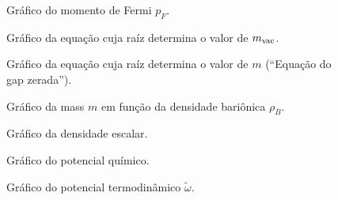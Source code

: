 \begin{enumerate}
\FloatBarrier


\begin{figure}
	
	\caption{Gráfico do momento de Fermi $p_F$. \protect}
	\label{Fig:fermi_momentum_NJL-Buballa_Set_1}
\end{figure}

\begin{figure}
	
	\caption{Gráfico da equação cuja raíz determina o valor de $m_{\rm{vac}}$. \protect}
	\label{Fig:vacuum_mass_equation_NJL-Buballa_Set_1}
\end{figure}

\begin{figure}
	
	\caption{Gráfico da equação cuja raíz determina o valor de $m$ (``Equação do gap zerada''). \protect}
	\label{Fig:gap_NJL-Buballa_Set_1}
\end{figure}

\begin{figure}
	
	\caption{Gráfico da mass $m$ em função da densidade bariônica $\rho_B$. \protect}
	\label{Fig:mass_NJL-Buballa_Set_1}
\end{figure}


\begin{figure}
	
	\caption{Gráfico da densidade escalar. \protect}
	\label{Fig:scalar_density_NJL-Buballa_Set_1}
\end{figure}

\begin{figure}
	
	\caption{Gráfico do potencial químico. \protect}
	\label{Fig:chemical_potential_NJL-Buballa_Set_1}
\end{figure}

\begin{figure}
	
	\caption{Gráfico do potencial termodinâmico $\tilde{\omega}$. \protect}
	\label{Fig:thermodynamic_potential_NJL-Buballa_Set_1}
\end{figure}


\end{enumerate}
